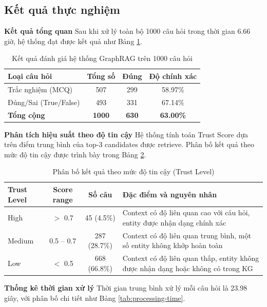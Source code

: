 \subsection{Kết quả thực nghiệm}

\textbf{Kết quả tổng quan}
Sau khi xử lý toàn bộ 1000 câu hỏi trong thời gian 6.66 giờ, hệ thống đạt được kết quả như Bảng \ref{tab:graphrag-main-results}.

\begin{table}[H]
\centering
\caption{Kết quả đánh giá hệ thống GraphRAG trên 1000 câu hỏi}
\label{tab:graphrag-main-results}
\begin{tabular}{|l|c|c|c|}
\hline
\textbf{Loại câu hỏi} & \textbf{Tổng số} & \textbf{Đúng} & \textbf{Độ chính xác} \\
\hline
Trắc nghiệm (MCQ) & 507 & 299 & 58.97\% \\
Đúng/Sai (True/False) & 493 & 331 & 67.14\% \\
\hline
\textbf{Tổng cộng} & \textbf{1000} & \textbf{630} & \textbf{63.00\%} \\
\hline
\end{tabular}
\end{table}

\textbf{Phân tích hiệu suất theo độ tin cậy}
Hệ thống tính toán Trust Score dựa trên điểm trung bình của top-3 candidates được retrieve. Phân bố kết quả theo mức độ tin cậy được trình bày trong Bảng \ref{tab:trust-distribution}.

\begin{table}[H]
\centering
\caption{Phân bố kết quả theo mức độ tin cậy (Trust Level)}
\label{tab:trust-distribution}
\begin{tabular}{|l|c|c|p{7cm}|}
\hline
\textbf{Trust Level} & \textbf{Score range} & \textbf{Số câu} & \textbf{Đặc điểm và nguyên nhân} \\
\hline
High & $>$ 0.7 & 45 (4.5\%) & Context có độ liên quan cao với câu hỏi, entity được nhận dạng chính xác \\
\hline
Medium & 0.5 -- 0.7 & 287 (28.7\%) & Context có độ liên quan trung bình, một số entity không khớp hoàn toàn \\
\hline
Low & $<$ 0.5 & 668 (66.8\%) & Context có độ liên quan thấp, entity không được nhận dạng hoặc không có trong KG \\
\hline
\end{tabular}
\end{table}

\textbf{Thống kê thời gian xử lý}
Thời gian trung bình xử lý mỗi câu hỏi là 23.98 giây, với phân bố chi tiết như Bảng \ref{tab:processing-time}.


